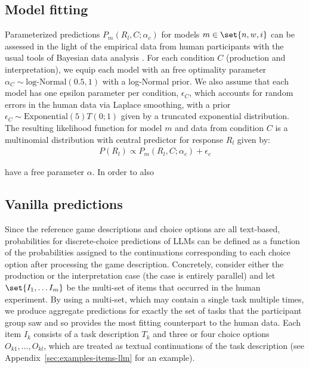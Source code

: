 \documentclass{article}
\begin{document}

\subsection{Model fitting}
\label{sec:model-fitting}

Parameterized predictions $P_{m}(R_{l}, C ; \alpha_{c})$ for models $m \in \set{n,w,i}$ can be assessed in the light of the empirical data from human participants with the usual tools of Bayesian data analysis \citep[e.g.][]{GelmanCarlin2014:Bayesian-Data-A,McElreath2016:Statistical-Ret,Lambert2018:A-Students-Guid}.
For each condition $C$ (production and interpretation), we equip each model with an free optimality parameter $\alpha_{C}\sim \text{log-Normal}(0.5,1)$ with a log-Normal prior.
We also assume that each model has one epsilon parameter per condition, $\epsilon_{C}$, which accounts for random errors in the human data via Laplace smoothing, with a prior $\epsilon_{C} \sim \text{Exponential}(5) T(0;1)$ given by a truncated exponential distribution.
The resulting likelihood function for model $m$ and data from condition $C$ is a multinomial distribution with central predictor for response $R_{l}$ given by:
%
\begin{align*}
  P(R_{l}) \propto P_{m}(R_{l}, C; \alpha_{c}) +  \epsilon_{c}
\end{align*}

have a free parameter $\alpha$.
In order to also


\newpage

\subsection{Vanilla predictions}
\label{sec:vanilla-predictions}

Since the reference game descriptions and choice options are all text-based, probabilities for discrete-choice predictions of LLMs can be defined as a function of the probabilities assigned to the continuations corresponding to each choice option after processing the game description.
Concretely, consider either the production or the interpretation case (the case is entirely parallel) and let \(\set{I_1, \dots I_m}\) be the multi-set of items that occurred in the human experiment.
By using a multi-set, which may contain a single task multiple times, we produce aggregate predictions for exactly the set of tasks that the participant group saw and so provides the most fitting counterpart to the human data.
Each item $I_{k}$ consists of a task description $T_{k}$ and three or four choice options $O_{k1}, \dots, O_{kl}$, which are treated as textual continuations of the task description (see Appendix~\ref{sec:examples-items-llm} for an example).
\end{document}
